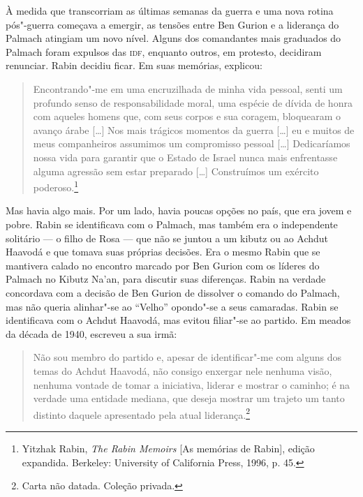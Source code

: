 À medida que transcorriam as últimas semanas da guerra e uma nova rotina
pós"-guerra começava a emergir, as tensões entre Ben Gurion e a liderança
do Palmach atingiam um novo nível. Alguns dos comandantes mais graduados
do Palmach foram expulsos das \textsc{idf}, enquanto outros, em protesto,
decidiram renunciar. Rabin decidiu ficar. Em suas memórias, explicou:

\begin{quote}
Encontrando"-me em uma encruzilhada de minha vida pessoal, senti um
profundo senso de responsabilidade moral, uma espécie de dívida de honra
com aqueles homens que, com seus corpos e sua coragem, bloquearam o
avanço árabe {[}\ldots{}{]} Nos mais trágicos momentos da guerra {[}\ldots{}{]} eu e muitos de
meus companheiros assumimos um compromisso pessoal {[}\ldots{}{]} Dedicaríamos nossa
vida para garantir que o Estado de Israel nunca mais enfrentasse alguma
agressão sem estar preparado {[}\ldots{}{]} Construímos um exército
poderoso.\footnote{Yitzhak Rabin, \emph{The Rabin Memoirs} {[}As memórias de Rabin{]}, edição expandida. Berkeley:
University of California Press, 1996, p. 45.}
\end{quote}

Mas havia algo mais. Por um lado, havia poucas opções no país, que era
jovem e pobre. Rabin se identificava com o Palmach, mas também era o
independente solitário --- o filho de Rosa --- que não se juntou a um
kibutz ou ao Achdut Haavodá e que tomava suas próprias decisões. Era o
mesmo Rabin que se mantivera calado no encontro marcado por Ben
Gurion com os líderes do Palmach no Kibutz Na'an, para discutir suas
diferenças. Rabin na verdade concordava com a decisão de Ben Gurion de
dissolver o comando do Palmach, mas não queria alinhar"-se ao ``Velho''
opondo"-se a seus camaradas. Rabin se identificava com o Achdut Haavodá,
mas evitou filiar"-se ao partido. Em meados da década de 1940, escreveu a
sua irmã: 

\begin{quote}
Não sou membro do partido e, apesar de identificar"-me com
alguns dos temas do Achdut Haavodá, não consigo enxergar nele nenhuma
visão, nenhuma vontade de tomar a iniciativa, liderar e mostrar o
caminho; é na verdade uma entidade mediana, que deseja mostrar um
trajeto um tanto distinto daquele apresentado pela atual
liderança.\footnote{Carta não datada. Coleção privada.}
\end{quote}

